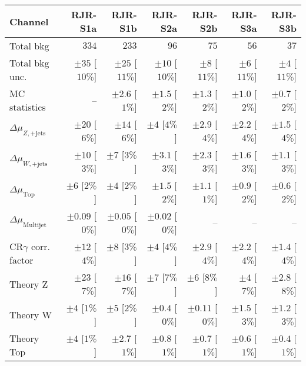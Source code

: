 
\begin{table}[hbtp]
\scriptsize
\begin{center}
\begin{tabular}{|lrrrrrr|}
\hline
Channel  &  \textbf{ RJR-S1a } & \textbf{ RJR-S1b } & \textbf{ RJR-S2a } & \textbf{ RJR-S2b } & \textbf{ RJR-S3a } & \textbf{ RJR-S3b }  \\ \hline
Total bkg  &  $334$  &  $233$  &  $96$  &  $75$  &  $56$  &  $37$ \\
Total bkg unc.  &  $\pm 35$  [$10\%$]  &  $\pm 25$  [$11\%$]  &  $\pm 10$  [$10\%$]  &  $\pm 8$  [$11\%$]  &  $\pm 6$  [$11\%$]  &  $\pm 4$  [$11\%$] \\
\hline
MC statistics  &   --    &  $\pm 2.6$ [$1\%$]  &  $\pm 1.5$ [$2\%$]  &  $\pm 1.3$ [$2\%$]  &  $\pm 1.0$ [$2\%$]  &  $\pm 0.7$ [$2\%$] \\
$\Delta\mu_{Z,\mathrm{+jets}}$    &  $\pm 20$ [$6\%$]  &  $\pm 14$ [$6\%$]  &  $\pm 4$ [$4\%$]  &  $\pm 2.9$ [$4\%$]  &  $\pm 2.2$ [$4\%$]  &  $\pm 1.5$ [$4\%$] \\
$\Delta\mu_{W,\mathrm{+jets}}$    &  $\pm 10$ [$3\%$]  &  $\pm 7$ [$3\%$]  &  $\pm 3.1$ [$3\%$]  &  $\pm 2.3$ [$3\%$]  &  $\pm 1.6$ [$3\%$]  &  $\pm 1.1$ [$3\%$] \\
$\Delta\mu_{  \mathrm{ Top}}$       &  $\pm 6$ [$2\%$]  &  $\pm 4$ [$2\%$]  &  $\pm 1.5$ [$2\%$]  &  $\pm 1.1$ [$1\%$]  &  $\pm 0.9$ [$2\%$]  &  $\pm 0.6$ [$2\%$] \\
$\Delta\mu_{  \mathrm{ Multijet}}$  &  $\pm 0.09$ [$0\%$]  &  $\pm 0.05$ [$0\%$]  &  $\pm 0.02$ [$0\%$]  &   --    &   --    &   --   \\
CR$\gamma$ corr. factor  &  $\pm 12$ [$4\%$]  &  $\pm 8$ [$3\%$]  &  $\pm 4$ [$4\%$]  &  $\pm 2.9$ [$4\%$]  &  $\pm 2.2$ [$4\%$]  &  $\pm 1.4$ [$4\%$] \\
Theory Z  &  $\pm 23$ [$7\%$]  &  $\pm 16$ [$7\%$]  &  $\pm 7$ [$7\%$]  &  $\pm 6$ [$8\%$]  &  $\pm 4$ [$7\%$]  &  $\pm 2.8$ [$8\%$] \\
Theory W  &  $\pm 4$ [$1\%$]  &  $\pm 5$ [$2\%$]  &  $\pm 0.4$ [$0\%$]  &  $\pm 0.11$ [$0\%$]  &  $\pm 1.5$ [$3\%$]  &  $\pm 1.2$ [$3\%$] \\
Theory Top   &  $\pm 4$ [$1\%$]  &  $\pm 2.7$ [$1\%$]  &  $\pm 0.8$ [$1\%$]  &  $\pm 0.7$ [$1\%$]  &  $\pm 0.6$ [$1\%$]  &  $\pm 0.4$ [$1\%$] \\

\end{tabular}
\end{center}
\end{table}
